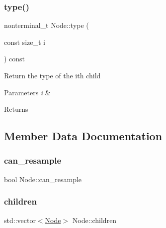 \subsubsection{\texorpdfstring{type()}{type()}}
{\footnotesize\ttfamily nonterminal\+\_\+t Node\+::type (\begin{DoxyParamCaption}\item[{const size\+\_\+t}]{i }\end{DoxyParamCaption}) const\hspace{0.3cm}{\ttfamily [inline]}}

Return the type of the i\textquotesingle{}th child 
\begin{DoxyParams}{Parameters}
{\em i} & \\
\hline
\end{DoxyParams}
\begin{DoxyReturn}{Returns}

\end{DoxyReturn}


\subsection{Member Data Documentation}
\mbox{\label{class_node_a98c14a51b240fbc7e438f40a12276257}} 
\subsubsection{\texorpdfstring{can\+\_\+resample}{can\_resample}}
{\footnotesize\ttfamily bool Node\+::can\+\_\+resample}

\mbox{\label{class_node_af7ddc81358470c3bf7a7819c8b77f53d}} 
\subsubsection{\texorpdfstring{children}{children}}
{\footnotesize\ttfamily std\+::vector$<$\hyperlink{class_node}{Node}$>$ Node\+::children\hspace{0.3cm}{\ttfamily [protected]}}

\mbox{\label{class_node_a336943f2e37a2b6fcbe8b47634719dec}} 
